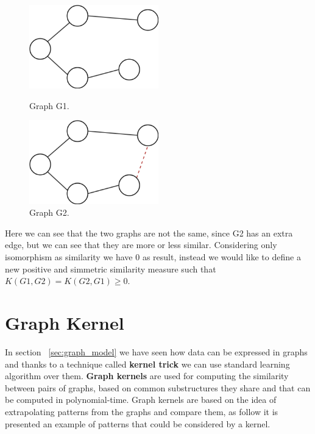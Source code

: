 \documentclass[11pt,a4paper]{article}
\begin{document}
\begin{figure}[h]
	\begin{minipage}[t]{0.5\linewidth}
		\centering
		\includegraphics[width=0.5\textwidth]{img/G1.png}
		\caption{Graph G1.}
		\label{f1}
	\end{minipage}
	\hspace{0.1cm}
	\begin{minipage}[t]{0.5\linewidth} 
		\centering
		\includegraphics[width=0.5\textwidth]{img/G2.png}
		\caption{Graph G2.}
		\label{f2}
	\end{minipage}        
\end{figure} 

Here we can see that the two graphs are not the same, since G2 has an extra edge, but we can see that they are more or less similar. Considering only isomorphism as similarity we have 0 as result, instead we would like to define a new positive and simmetric similarity measure such that $K(G1,G2) = K(G2,G1) \geq 0$.




\section{Graph Kernel}
In section ~\ref{sec:graph_model} we have seen how data can be expressed in graphs and thanks to a technique called \textbf{kernel trick} we can use standard learning algorithm over them. \textbf{Graph kernels} are used for computing the similarity between pairs of graphs, based on common substructures they share and that can be computed in polynomial-time. Graph kernels are based on the idea of extrapolating patterns from the graphs and compare them, as follow it is presented an example of patterns that could be considered by a kernel.
\end{document}
